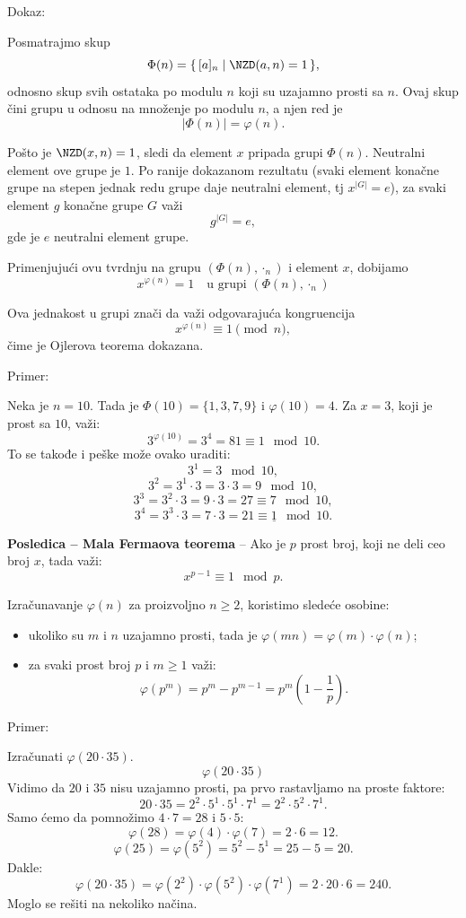 \documentclass[a4paper,12pt]{article}
\newcommand{\f}[1]{\(#1\)}
\begin{document}
  Dokaz:

Posmatrajmo skup
\[
\Phi(n) = \{\, [a]_n \mid \NZD(a,n)=1 \,\},
\]
odnosno skup svih ostataka po modulu $n$ koji su uzajamno prosti sa $n$.
Ovaj skup čini grupu u odnosu na množenje po modulu $n$, a njen red je
\[
|\Phi(n)| = \varphi(n).
\]

Pošto je $\NZD(x,n)=1$, sledi da element $x$ pripada grupi
$\Phi(n)$. Neutralni element ove grupe je $1$.
Po ranije dokazanom rezultatu (svaki element konačne grupe na stepen
jednak redu grupe daje neutralni element, tj \f{x^{|G|}=e}), za svaki element $g$ konačne
grupe $G$ važi
\[
g^{|G|} = e,
\]
gde je $e$ neutralni element grupe.

Primenjujući ovu tvrdnju na grupu $(\Phi(n), \cdot_n)$ i element $x$,
dobijamo
\[
x^{\varphi(n)} = 1 \quad \text{u grupi } (\Phi(n), \cdot_n)
\]

Ova jednakost u grupi znači da važi odgovarajuća kongruencija
\[
x^{\varphi(n)} \equiv 1 \pmod n,
\]
čime je Ojlerova teorema dokazana.

Primer:

Neka je \( n = 10 \). Tada je \( \Phi(10) = \{ 1, 3, 7, 9 \} \) i \( \varphi(10) = 4 \).
Za \( x = 3 \), koji je prost sa \( 10 \), važi:
\[
3^{\varphi(10)} = 3^4 = 81 \equiv 1 \mod 10.
\]
To se takođe i peške može ovako uraditi:
\[3^1 = 3 \mod 10,\]
\[3^2 = 3^1 \cdot 3 = 3 \cdot 3 = 9 \mod 10,\]
\[3^3 = 3^2 \cdot 3 = 9 \cdot 3 = 27 \equiv 7 \mod 10,\]
\[3^4 = 3^3 \cdot 3 = 7 \cdot 3 = 21 \equiv \underline{1} \mod 10.\]

\textbf{Posledica -- Mala Fermaova teorema} -- Ako je $p$ prost broj, koji ne deli ceo broj $x$, tada važi:
\[
  x^{p-1} \equiv 1 \mod p.
\]

\bigskip

Izračunavanje \f{\varphi(n)} za proizvoljno \f{n \geq 2}, koristimo sledeće osobine:
\begin{itemize}
  \item ukoliko su \f{m \text{ i } n} uzajamno prosti, tada je \f{\varphi(mn) = \varphi(m) \cdot \varphi(n)};
  \item za svaki prost broj \f{p} i \f{m \geq 1} važi:
  \[
    \varphi(p^m) = p^m - p^{m-1} = p^m \left( 1 - \frac{1}{p} \right).
  \]
\end{itemize}
\smallskip
Primer:

Izračunati \f{\varphi(20\cdot35)}.
\[
  \varphi(20 \cdot 35)
\]
Vidimo da \f{20} i \f{35} nisu uzajamno prosti, pa prvo rastavljamo na proste faktore:
\[
  20 \cdot 35 = 2^2 \cdot 5^1 \cdot 5^1 \cdot 7^1 = 2^2 \cdot 5^2 \cdot 7^1.
\]
Samo ćemo da pomnožimo \f{4 \cdot 7 = 28} i \f{5 \cdot 5}:
\[
  \varphi(28) = \varphi(4) \cdot \varphi(7) = 2 \cdot 6 = 12.
\]
\[
  \varphi(25) = \varphi(5^2) = 5^2 - 5^1 = 25 - 5 = 20.
\]
Dakle:
\[
  \varphi(20 \cdot 35) = \varphi(2^2) \cdot \varphi(5^2) \cdot \varphi(7^1) = 2 \cdot 20 \cdot 6 = 240.
\]
Moglo se rešiti na nekoliko načina.
\end{document}
